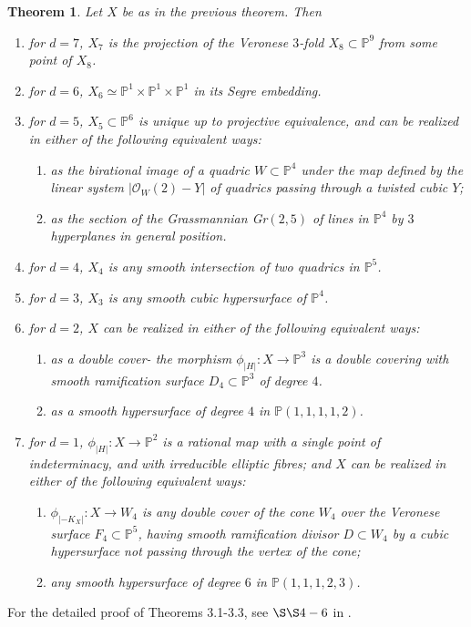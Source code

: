 \documentclass[11pt]{amsart}
\theoremstyle{plain}
\newtheorem{theorem}{Theorem}[section]
\theoremstyle{definition}
\theoremstyle{expl}
\begin{document}
\begin{theorem} Let $X$ be as in the previous theorem. Then 
\begin{enumerate}        
        \item[(i)] for $d=7$, $X_7$ is the projection of the Veronese $3$-fold $X_8 \subset \mathbb{P}^9$ from some point of $X_8$.
        \item[(ii)] for $d=6$, $X_6 \simeq \mathbb{P}^1 \times \mathbb{P}^1\times \mathbb{P}^1$ in its Segre embedding.
        \item[(iii)] for $d=5$, $X_5 \subset \mathbb{P}^6$ is unique up to projective equivalence, and can be realized in either of the following equivalent ways:
        \begin{enumerate}
            \item[(a)] as the birational image of a quadric $W \subset \mathbb{P}^4$ under the map defined by the linear system $|\mathcal{O}_W(2)-Y|$ of quadrics passing through a twisted cubic $Y$;
            \item[(b)] as the section of the Grassmannian Gr$(2,5)$ of lines in $\mathbb{P}^4$ by $3$ hyperplanes in general position.
        \end{enumerate}
        \item[(iv)] for $d=4$, $X_4$ is any smooth intersection of two quadrics in $\mathbb{P}^5$.
        \item[(v)] for $d=3$, $X_3$ is any smooth cubic hypersurface of $\mathbb{P}^4$. 
        \item[(vi)] for $d=2$, $X$ can be realized in either of the following equivalent ways:
        \begin{enumerate}
            \item[(a)] as a double cover- the morphism $\phi_{|H|}: X \to \mathbb{P}^3$ is a double covering with smooth ramification surface $D_4 \subset \mathbb{P}^3$ of degree $4$.  
            \item[(b)] as a smooth hypersurface of degree $4$ in $\mathbb{P}(1,1,1,1,2)$.
        \end{enumerate}
        \item[(vii)] for $d=1$, $\phi_{|H|}: X \to \mathbb{P}^2$ is a rational map with a single point of indeterminacy, and with irreducible elliptic fibres; and $X$ can be realized in either of the following equivalent ways:
        \begin{enumerate}
            \item[(a)] $\phi_{|-K_X|}: X \to W_4$ is any double cover of the cone $W_4$ over the Veronese surface $F_4 \subset \mathbb{P}^5$, having smooth ramification divisor $D \subset W_4$ by a cubic hypersurface not passing through the vertex of the cone;
            \item[(b)] any smooth hypersurface of degree $6$ in $\mathbb{P}(1,1,1,2,3)$.
        \end{enumerate}
    \end{enumerate}
\end{theorem}
For the detailed proof of Theorems 3.1-3.3, see $\S\S 4-6$ in \cite{Isk77}. 
\end{document}
